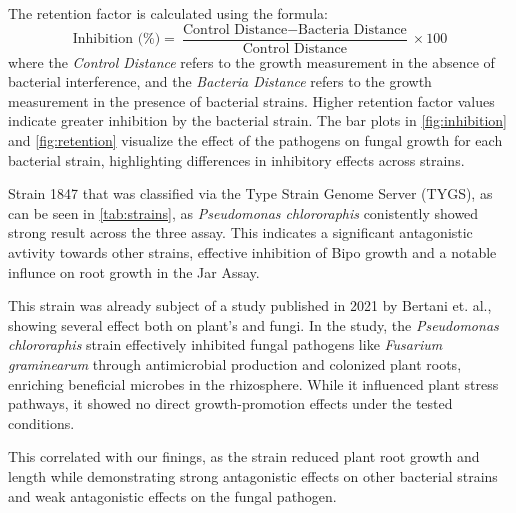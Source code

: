 \noindent
The retention factor is calculated using the formula:
\[
\text{Inhibition (\%)} = \frac{\text{Control Distance} - \text{Bacteria Distance}}{\text{Control Distance}} \times 100
\]
where the \textit{Control Distance} refers to the growth measurement in the absence of bacterial interference, and the \textit{Bacteria Distance} refers to the growth measurement in the presence of bacterial strains. Higher retention factor values indicate greater inhibition by the bacterial strain. The bar plots in \autoref{fig:inhibition} and \autoref{fig:retention} visualize the effect of the pathogens on fungal growth for each bacterial strain, highlighting differences in inhibitory effects across strains.


Strain 1847 that was classified via the Type Strain Genome Server (TYGS), as can be seen in \autoref{tab:strains}, as \textit{Pseudomonas chlororaphis} conistently showed strong result across the three assay. This indicates a significant antagonistic avtivity towards other strains, effective inhibition of \ac{Bipo} growth and a notable influnce on root growth in the Jar Assay.

This strain was already subject of a study published in 2021 by Bertani et. al., showing several effect both on plant's and fungi. 
In the study, the \textit{Pseudomonas chlororaphis} strain effectively inhibited fungal pathogens like \textit{Fusarium graminearum} through antimicrobial production and colonized plant roots, enriching beneficial microbes in the rhizosphere. While it influenced plant stress pathways, it showed no direct growth-promotion effects under the tested conditions. \cite{bertani2021Isolation}

This correlated with our finings, as the strain reduced plant root growth and length while demonstrating  strong antagonistic effects on other bacterial strains and weak antagonistic effects on the fungal pathogen.